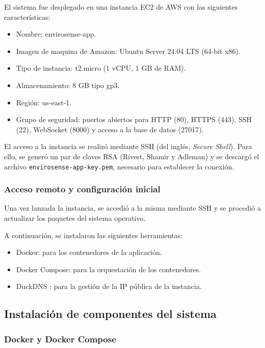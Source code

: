 El sistema fue desplegado en una instancia EC2 de AWS con las siguientes
características:

\begin{itemize}
    \item Nombre: envirosense-app.
    \item Imagen de maquina de Amazon: Ubuntu Server 24.04 LTS (64-bit x86).
    \item Tipo de instancia: t2.micro (1 vCPU, 1 GB de RAM).
    \item Almacenamiento: 8 GB tipo gp3.
    \item Región: us-east-1.
    \item Grupo de seguridad: puertos abiertos para HTTP (80), HTTPS (443), SSH (22),
          WebSocket (8000) y acceso a la base de datos (27017).
\end{itemize}

El acceso a la instancia se realizó mediante SSH (del inglés, \textit{Secure
    Shell}). Para ello, se generó un par de claves RSA (Rivest, Shamir y Adleman) y
se descargó el archivo \texttt{envirosense-app-key.pem}, necesario para
establecer la conexión.

\subsubsection{Acceso remoto y configuración inicial}

Una vez lanzada la instancia, se accedió a la misma mediante SSH y se procedió
a actualizar los paquetes del sistema operativo.

A continuación, se instalaron las siguientes herramientas:
\begin{itemize}
    \item Docker: para los contenedores de la aplicación.
    \item Docker Compose: para la orquestación de los contenedores.
    \item DuckDNS \cite{DuckDNS}: para la gestión de la IP pública de la instancia.
\end{itemize}

\subsection{Instalación de componentes del sistema}

\subsubsection{Docker y Docker Compose}

